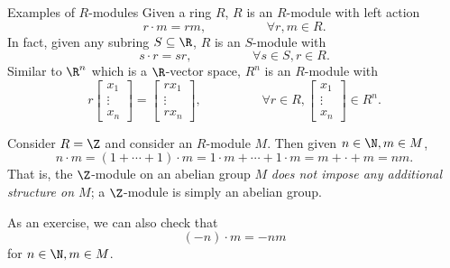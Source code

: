\documentclass[pmath441]{subfiles}
\begin{document}
    \begin{example}{Examples of $R$-modules}
        Given a ring $R$, $R$ is an $R$-module with left action
        \begin{equation*}
            r\cdot m = rm, \hspace{2cm}\forall r,m\in R.
        \end{equation*}
        In fact, given any subring $S\subseteq\R$, $R$ is an $S$-module with
        \begin{equation*}
            s\cdot r = sr, \hspace{2cm}\forall s\in S, r\in R.
        \end{equation*}
        Similar to $\R^n$ which is a $\R$-vector space, $R^n$ is an $R$-module with
        \begin{equation*}
            r\begin{bmatrix} x_1 \\ \vdots \\ x_n \end{bmatrix} = \begin{bmatrix} rx_1 \\ \vdots \\ rx_n \end{bmatrix}, \hspace{2cm}\forall r\in R, \begin{bmatrix} x_1 \\ \vdots \\ x_n \end{bmatrix}\in R^n.
        \end{equation*}
    \end{example}

    \rruleline

    \begin{example}{}
        Consider $R=\Z$ and consider an $R$-module $M$. Then given $n\in\N,m\in M$,
        \begin{equation*}
            n\cdot m = \left( 1+\cdots+1 \right)\cdot m = 1\cdot m + \cdots + 1\cdot m = m + \cdot + m = nm.
        \end{equation*}
        That is, the $\Z$-module on an abelian group $M$ \textit{does not impose any additional structure on $M$}; a $\Z$-module is simply an abelian group.

        As an exercise, we can also check that
        \begin{equation*}
            \left( -n \right)\cdot m = -nm
        \end{equation*}
        for $n\in\N, m\in M$.
    \end{example}
\end{document}
